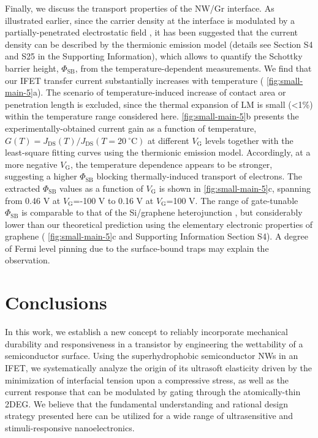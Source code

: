 Finally, we discuss the transport properties of the NW/Gr
interface. As illustrated earlier, since the carrier density at the
interface is modulated by a partially-penetrated electrostatic field
, it has been suggested that the current
density can be described by the thermionic emission model
\cite{Sze_2006_Mosfets} (details see Section S4 and  S25 in the
Supporting Information), which allows to quantify the Schottky barrier
height, \(\Phi_{\mathrm{SB}}\), from the temperature-dependent
measurements. We find that our IFET transfer current substantially
increases with temperature ( \autoref{fig:small-main-5}a). The scenario of
temperature-induced increase of contact area or penetration length is
excluded, since the thermal expansion of LM is small (\textless{}1\%)
within the temperature range considered here.  \autoref{fig:small-main-5}b
presents the experimentally-obtained current gain as a function of
temperature,
\(G(T)=J_{\mathrm{DS}}(T)/J_{\mathrm{DS}}(T=20\ ^{\circ} \mathrm{C})\)
at different \(V_{\mathrm{G}}\) levels together with the least-square
fitting curves using the thermionic emission model. Accordingly, at a
more negative \(V_{\mathrm{G}}\), the temperature dependence appears
to be stronger, suggesting a higher \(\Phi_{\mathrm{SB}}\) blocking
thermally-induced transport of electrons. The extracted
\(\Phi_{\mathrm{SB}}\) values as a function of \(V_{\mathrm{G}}\) is
shown in  \autoref{fig:small-main-5}c, spanning from 0.46 V at
\(V_{\mathrm{G}}\)=-100 V to 0.16 V at \(V_{\mathrm{G}}\)=100 V.  The
range of gate-tunable \(\Phi_{\mathrm{SB}}\) is comparable to that of
the Si/graphene heterojunction \cite{Yang_2012_Barristor}, but
considerably lower than our theoretical prediction using the
elementary electronic properties of graphene ( \autoref{fig:small-main-5}c
and Supporting Information Section S4). A degree of Fermi level
pinning due to the surface-bound traps \cite{Meric_2008_saturation_gr_FET} may explain
the observation.

\section{Conclusions}
\label{sec:small-conclusions}





In this work, we establish a new concept to reliably incorporate
mechanical durability and responsiveness in a transistor by
engineering the wettability of a semiconductor surface. Using the
superhydrophobic semiconductor NWs in an IFET, we systematically
analyze the origin of its ultrasoft elasticity driven by the
minimization of interfacial tension upon a compressive stress, as well
as the current response that can be modulated by gating through the
atomically-thin 2DEG. We believe that the fundamental understanding
and rational design strategy presented here can be utilized for a wide
range of ultrasensitive and stimuli-responsive nanoelectronics.




